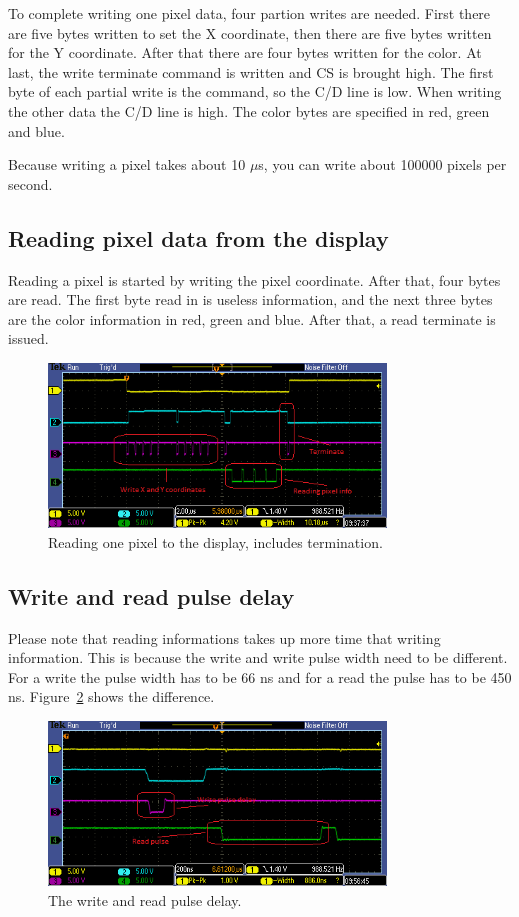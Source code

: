 \documentclass[12pt]{article}
\begin{document}
To complete writing one pixel data, four partion writes are needed.
First there are five bytes written to set the X coordinate, then there are five bytes written for the Y coordinate. After that there are four bytes written for the color. At last, the write terminate command is written and CS is brought high. The first byte of each partial write is the command, so the C/D line is low. When writing the other data the C/D line is high. The color bytes are specified in red, green and blue.

Because writing a pixel takes about 10 $\mu$s, you can write about 100000 pixels per second.

\subsection{Reading pixel data from the display}
Reading a pixel is started by writing the pixel coordinate. After that, four bytes are read. The first byte read in is useless information, and the next three bytes are the color information in red, green and blue. After that, a read terminate is issued.

\begin{figure}[!ht]
\centering
\includegraphics[width=0.8\textwidth]{pixel_read}
\caption{Reading one pixel to the display, includes termination.}
\label{fig:11}
\end{figure}

\subsection{Write and read pulse delay}
Please note that reading informations takes up more time that writing information. This is because the write and write pulse width need to be different. For a write the pulse width has to be 66 ns and for a read the pulse has to be 450 ns. Figure~\ref{fig:12} shows the difference.

\begin{figure}[!ht]
\centering
\includegraphics[width=0.8\textwidth]{write_read_delay}
\caption{The write and read pulse delay.}
\label{fig:12}
\end{figure}
\end{document}
